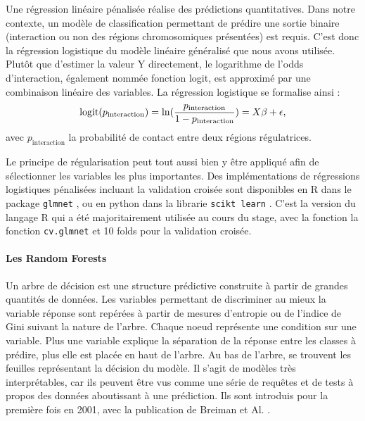\documentclass[french]{llncs}
\begin{document}
Une régression linéaire pénalisée réalise des prédictions quantitatives. Dans notre contexte, un modèle de classification permettant de prédire une sortie binaire (interaction ou non des régions chromosomiques présentées) est requis. C'est donc la régression logistique du modèle linéaire généralisé que nous avons utilisée. Plutôt que d'estimer la valeur Y directement, le logarithme de l'odds d'interaction, également nommée fonction logit, est approximé par une combinaison linéaire des variables. La régression logistique se formalise ainsi :
\begin{equation}
\mathrm{logit}(p_{\mathrm{interaction}}) = \mathrm{ln}\large(\frac{p_{\mathrm{interaction}}}{1-p_\mathrm{interaction}}\large) = X\beta + \epsilon,
\end{equation}
 avec $p_\mathrm{interaction}$ la probabilité de contact entre deux régions régulatrices.
 
Le principe de régularisation peut tout aussi bien y être appliqué afin de sélectionner les variables les plus importantes. 
Des implémentations de régressions logistiques pénalisées incluant la validation croisée sont disponibles en R dans le package \texttt{glmnet} \cite{friedman_regularization_2010}, ou en python dans la librarie \texttt{scikt learn} \cite{scikit-learn}. C'est la version du langage R qui a été majoritairement utilisée au cours du stage, avec la fonction la fonction \texttt{cv.glmnet} et 10 folds pour la validation croisée.

\paragraph{Les Random Forests}

Un arbre de décision est une structure prédictive construite à partir de grandes quantités de données. Les variables permettant de discriminer au mieux la variable réponse sont repérées à partir de mesures d'entropie ou de l'indice de Gini suivant la nature de l'arbre. Chaque noeud représente une condition sur une variable. Plus une variable explique la séparation de la réponse entre les classes à prédire, plus elle est placée en haut de l'arbre.  Au bas de l'arbre, se trouvent les feuilles représentant la décision du modèle. Il s'agit de modèles très interprétables, car ils peuvent être vus comme une série de requêtes et de tests à propos des données aboutissant à une prédiction. Ils sont introduis pour la première fois en 2001, avec la publication de Breiman et Al. \cite{breiman2001random}.
\end{document}

